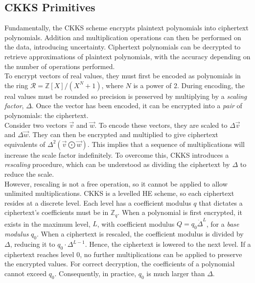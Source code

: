 \subsection{CKKS Primitives}
\label{sec:CKKS}
\setlength{\leftskip}{0.5cm}
\indent \indent
Fundamentally, the CKKS scheme encrypts plaintext polynomials into ciphertext polynomials. Addition and multiplication operations can then be performed on the data, introducing uncertainty. Ciphertext polynomials can be decrypted to retrieve approximations of plaintext polynomials, with the accuracy depending on the number of operations performed.
\smallskip \\ \indent
To encrypt vectors of real values, they must first be encoded as polynomials in the ring $\mathcal{R} = \mathbb{Z}[X] / (X^N + 1)$, where $N$ is a power of 2. During encoding, the real values must be rounded so precision is preserved by multiplying by a \textit{scaling factor}, $\Delta$. Once the vector has been encoded, it can be encrypted into a \textit{pair} of polynomials: the ciphertext.
\smallskip \\ \indent
Consider two vectors $\vec{v}$ and $\vec{w}$. To encode these vectors, they are scaled to $\Delta \vec{v}$ and $\Delta \vec{w}$.  They can then be encrypted and multiplied to give ciphertext equivalents of $\Delta^2 (\vec{v} \bigodot \vec{w})$. This implies that a sequence of multiplications will increase the scale factor indefinitely. To overcome this, CKKS introduces a \textit{rescaling} procedure, which can be understood as dividing the ciphertext by $\Delta$ to reduce the scale.
\smallskip \\ \indent
However, rescaling is not a free operation, so it cannot be applied to allow unlimited multiplications. CKKS is a levelled HE scheme, so each ciphertext resides at a discrete level. Each level has a coefficient modulus $q$ that dictates a ciphertext's coefficients must be in $\mathbb{Z}_q$. When a polynomial is first encrypted, it exists in the maximum level, $L$, with coefficient modulus $Q = q_0 \dot \Delta^L$, for a \textit{base modulus} $q_0$. When a ciphertext is rescaled, the coefficient modulus is divided by $\Delta$, reducing it to $q_0 \cdot \Delta^{L-1}$. Hence, the ciphertext is lowered to the next level. If a ciphertext reaches level 0, no further multiplications can be applied to preserve the encrypted values. For correct decryption, the coefficients of a polynomial cannot exceed $q_0$. Consequently, in practice, $q_0$ is much larger than $\Delta$.

\setlength{\leftskip}{0cm}
